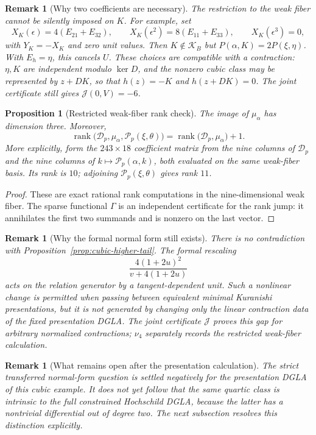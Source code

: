 \documentclass[11pt]{amsart}
\newtheorem{proposition}[theorem]{Proposition}
\newtheorem{remark}[theorem]{Remark}
\newcommand{\rank}{\operatorname{rank}}
\newcommand{\cD}{\mathscr D}
\newcommand{\cP}{\mathscr P}
\begin{document}
\begin{remark}[Why two coefficients are necessary]
The restriction to the weak fiber cannot be silently imposed on $K$.
For example, set
\[
X_K(\epsilon)=4(E_{21}+E_{32}),\qquad
X_K(\epsilon^2)=8(E_{11}+E_{33}),\qquad X_K(\epsilon^3)=0,
\]
with $Y_K=-X_K$ and zero unit values. Then $K\notin\mathcal K_B$ but
$P(\alpha,K)=2P(\xi,\eta)$. With $E_h=\eta$, this cancels $U$.
These choices are compatible with a contraction: $\eta,K$ are independent
modulo $\ker D$, and the nonzero cubic class may be represented by
$z+DK$, so that $h(z)=-K$ and $h(z+DK)=0$.
The joint certificate still gives $\mathcal J(0,V)=-6$.
\end{remark}

\begin{proposition}[Restricted weak-fiber rank check]\label{prop:quartic-rank-check}
The image of $\mu_\alpha$ has dimension three.  Moreover,
\[
\rank\bigl(\cD_p,\mu_\alpha,\cP_p(\xi,\theta)\bigr)
=
\rank\bigl(\cD_p,\mu_\alpha\bigr)+1.
\]
More explicitly, form the $243\times18$ coefficient matrix from the nine
columns of $\cD_p$ and the nine columns of
$k\mapsto\cP_p(\alpha,k)$, both evaluated on the same weak-fiber basis.
Its rank is $10$; adjoining $\cP_p(\xi,\theta)$ gives rank $11$.
\end{proposition}

\begin{proof}
These are exact rational rank computations in the nine-dimensional weak fiber.  The sparse functional $\Gamma$ is an independent certificate for the rank jump: it annihilates the first two summands and is nonzero on the last vector.
\end{proof}

\begin{remark}[Why the formal normal form still exists]
There is no contradiction with Proposition~\ref{prop:cubic-higher-tail}.  The formal rescaling
\[
\frac{4(1+2u)^2}{v+4(1+2u)}
\]
acts on the \emph{relation generator} by a tangent-dependent unit.  Such a nonlinear change is permitted when passing between equivalent minimal Kuranishi presentations, but it is not generated by changing only the linear contraction data of the fixed presentation DGLA.  The joint certificate $\mathcal J$ proves this gap for arbitrary normalized
contractions; $\nu_4$ separately records the restricted weak-fiber calculation.
\end{remark}

\begin{remark}[What remains open after the presentation calculation]
The strict transferred normal-form question is settled negatively for the \emph{presentation} DGLA of this cubic example.  It does not yet follow that the same quartic class is intrinsic to the full constrained Hochschild DGLA, because the latter has a nontrivial differential out of degree two.  The next subsection resolves this distinction explicitly.
\end{remark}
\end{document}
